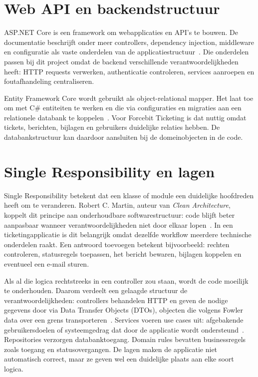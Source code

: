 \section{Web API en backendstructuur}

ASP.NET Core is een framework om webapplicaties en API's te bouwen. De documentatie beschrijft onder meer controllers, dependency injection, middleware en configuratie als vaste onderdelen van de applicatiestructuur~\autocite{MicrosoftASPNetCore2026}. Die onderdelen passen bij dit project omdat de backend verschillende verantwoordelijkheden heeft: HTTP requests verwerken, authenticatie controleren, services aanroepen en foutafhandeling centraliseren.

Entity Framework Core wordt gebruikt als object-relational mapper. Het laat toe om met C\# entiteiten te werken en die via configuraties en migraties aan een relationele databank te koppelen~\autocite{MicrosoftEFCore2026}. Voor Forcebit Ticketing is dat nuttig omdat tickets, berichten, bijlagen en gebruikers duidelijke relaties hebben. De databankstructuur kan daardoor aansluiten bij de domeinobjecten in de code.

\section{Single Responsibility en lagen}

Single Responsibility betekent dat een klasse of module een duidelijke hoofdreden heeft om te veranderen. Robert C. Martin, auteur van \textit{Clean Architecture}, koppelt dit principe aan onderhoudbare softwarestructuur: code blijft beter aanpasbaar wanneer verantwoordelijkheden niet door elkaar lopen~\autocite{Martin2017CleanArchitecture}. In een ticketingapplicatie is dit belangrijk omdat dezelfde workflow meerdere technische onderdelen raakt. Een antwoord toevoegen betekent bijvoorbeeld: rechten controleren, statusregels toepassen, het bericht bewaren, bijlagen koppelen en eventueel een e-mail sturen.

Als al die logica rechtstreeks in een controller zou staan, wordt de code moeilijk te onderhouden. Daarom verdeelt een gelaagde structuur de verantwoordelijkheden: controllers behandelen HTTP en geven de nodige gegevens door via Data Transfer Objects (DTOs), objecten die volgens Fowler data over een grens transporteren~\autocite{Fowler2003DataTransferObject}. Services voeren use cases uit: afgebakende gebruikersdoelen of systeemgedrag dat door de applicatie wordt ondersteund~\autocite{Jacobson1992UseCaseDriven}. Repositories verzorgen databanktoegang. Domain rules bevatten businessregels zoals toegang en statusovergangen. De lagen maken de applicatie niet automatisch correct, maar ze geven wel een duidelijke plaats aan elke soort logica.

